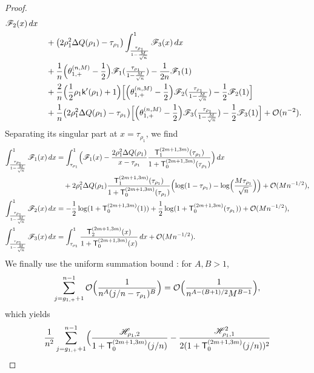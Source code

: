 \documentclass[a4paper]{article}
\numberwithin{equation}{section}
\begin{document}
\begin{proof}
\begin{align*}
\mathscr{F}_2(x)
\,dx
\\
&\quad+
\bigl(2\rho_1^2\Delta Q(\rho_1)-\tau_{\rho_1}\bigr)
\int_{\frac{\tau_{\rho_1}}{1-\frac{M}{\sqrt{n}}}}^{1}
\mathscr{F}_3(x)
\,dx
\\
&\quad 
+
\frac{1}{n}\Bigl(\theta_{1,+}^{(n,M)}-\frac{1}{2}\Bigr)\mathscr{F}_{1}(\tfrac{\tau_{\rho_1}}{1-\frac{M}{\sqrt{n}}})
-\frac{1}{2n}\mathscr{F}_{1}(1)
\\
&\quad+
\frac{2}{n}\Bigl(\frac{1}{2}\rho_1\mathsf{k}'(\rho_1)+1\Bigr)\Bigl[
\Bigl(\theta_{1,+}^{(n,M)}-\frac{1}{2}\Bigr)\mathscr{F}_{2}(\tfrac{\tau_{\rho_1}}{1-\frac{M}{\sqrt{n}}})
-\frac{1}{2}\mathscr{F}_{2}(1)
\Bigr]
\\
&\quad 
+\frac{1}{n}\bigl(2\rho_1^2\Delta Q(\rho_1)-\tau_{\rho_1}\bigr)
\Bigl[
\Bigl(\theta_{1,+}^{(n,M)}-\frac{1}{2}\Bigr)\mathscr{F}_{3}(\tfrac{\tau_{\rho_1}}{1-\frac{M}{\sqrt{n}}})
-\frac{1}{2}\mathscr{F}_{3}(1)
\Bigr]
+\mathcal{O}(n^{-2}). 
\end{align*}
Separating its singular part at $x=\tau_{\rho_1}$, we find
\begin{align*}
\int_{\frac{\tau_{\rho_1}}{1-\frac{M}{\sqrt{n}}}}^{1}
\mathscr{F}_1(x)\,dx
&=
\int_{\tau_{\rho_1}}^{1}
\Bigl(\mathscr{F}_1(x)
-\frac{2\rho_1^2\Delta Q(\rho_1)}{x-\tau_{\rho_1}}\frac{\mathsf{T}_{1}^{(2m+1,3m)}(\tau_{\rho_1})}{1+\mathsf{T}_{0}^{(2m+1,3m)}(\tau_{\rho_1})}\Bigr)\,dx
\\
&\quad 
+
2\rho_1^2\Delta Q(\rho_1)
\frac{\mathsf{T}_{1}^{(2m+1,3m)}(\tau_{\rho_1})}{1+\mathsf{T}_{0}^{(2m+1,3m)}(\tau_{\rho_1})}
\Bigl( 
\log(1-\tau_{\rho_1})-\log\Bigl(\frac{M\tau_{\rho_1}}{\sqrt{n}}\Bigr)
\Bigr)
+
\mathcal{O}(Mn^{-1/2}), 
\\
\int_{\frac{\tau_{\rho_1}}{1-\frac{M}{\sqrt{n}}}}^{1}
\mathscr{F}_2(x)
\,dx
&
=
-\frac{1}{2}\log(1+\mathsf{T}_0^{(2m+1,3m)}(1))
+\frac{1}{2}\log(1+\mathsf{T}_0^{(2m+1,3m)}(\tau_{\rho_1}))
+\mathcal{O}(Mn^{-1/2}), 
\\
\int_{\frac{\tau_{\rho_1}}{1-\frac{M}{\sqrt{n}}}}^{1}
\mathscr{F}_3(x)\,dx
&=
\int_{\tau_{\rho_1}}^{1}
\frac{\mathsf{T}_{2}^{(2m+1,3m)}(x)}{1+\mathsf{T}_{0}^{(2m+1,3m)}(x)}\,dx
+
\mathcal{O}(Mn^{-1/2}). 
\end{align*}
We finally use the uniform summation bound \cite[proof of Lemma~2.6]{ACCL1}: for
$A,B>1$,
\[
\sum_{j=g_{1,+}+1}^{n-1}\mathcal{O}\Bigl(\frac{1}{n^A(j/n-\tau_{\rho_1})^B}\Bigr)
=
\mathcal{O}\Bigl(\frac{1}{n^{A-(B+1)/2}M^{B-1}}\Bigr),
\]
which yields
\begin{align*}
&\quad \frac{1}{n^2}\sum_{j=g_{1,+}+1}^{n-1}\Bigl( 
\frac{\mathscr{H}_{\rho_1,2}}{1+\mathsf{T}_{0}^{(2m+1,3m)}(j/n)}-\frac{\mathscr{H}_{\rho_1,1}^2}{2(1+\mathsf{T}_{0}^{(2m+1,3m)}(j/n))^2}

\end{align*}
\end{proof}
\end{document}
